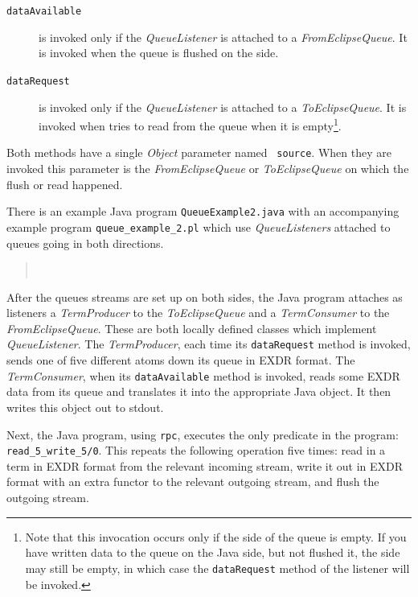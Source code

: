 \begin{description}
\item[{\tt dataAvailable}] is invoked only if the {\it QueueListener} is 
  attached to a {\it FromEclipseQueue}. It is invoked when the queue is 
  flushed on the {\eclipse} side.
\item[{\tt dataRequest}] is invoked only if the {\it QueueListener} is 
  attached to a {\it ToEclipseQueue}. It is invoked when {\eclipse} tries
  to read from the queue when it is empty\footnote{Note that this invocation occurs only if the {\eclipse} side of the queue is empty. If you have written data to the queue on the Java side, but not flushed it, the {\eclipse} side may still be empty, in which case the {\tt dataRequest} method of the listener will be invoked.}.
\end{description}

Both methods have a single {\it Object} parameter named {\tt
source}. When they are invoked this parameter is the {\it FromEclipseQueue}
or {\it ToEclipseQueue} on which the flush or read happened.

There is an example Java program {\tt QueueExample2.java} with an
accompanying example {\eclipse} program {\tt queue\_example\_2.pl}
which use {\it QueueListeners} attached to queues going in both
directions.
\begin{quote}
\\
\end{quote}
After the queues streams are set up on both sides, the Java program
attaches as listeners a {\it TermProducer} to the {\it ToEclipseQueue}
and a {\it TermConsumer} to the {\it FromEclipseQueue}. These are both
locally defined classes which implement {\it QueueListener}. The {\it
TermProducer}, each time its {\tt dataRequest} method is invoked, sends
one of five different atoms down its queue in EXDR format. The
{\it TermConsumer}, when its {\tt dataAvailable} method is invoked,
reads some EXDR data from its queue and translates it into the
appropriate Java object. It then writes this object out to stdout.

Next, the Java program, using {\tt rpc}, executes the only predicate
in the {\eclipse} program: {\tt read\_5\_write\_5/0}. This repeats the
following operation five times: read in a term in EXDR format from the
relevant incoming stream, write it out in EXDR format with an
extra functor to the relevant outgoing stream, and flush the
outgoing stream.

